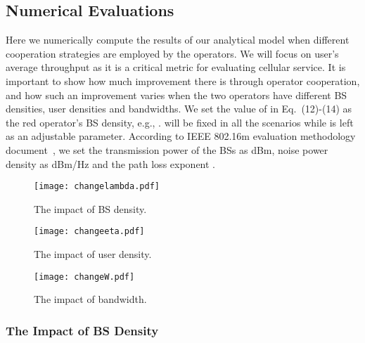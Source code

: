 \documentclass[conference]{IEEEtran}
\begin{document}
\subsection{Numerical Evaluations}

Here we numerically compute the results of our analytical model when different cooperation strategies are employed by the operators. We will focus on user's average throughput as it is a critical metric for evaluating cellular service.  It is important to show how much improvement there is through operator cooperation, and how such an improvement varies when the two operators have different BS densities, user densities and bandwidths. We set the value of  in Eq.~(12)-(14) as the red operator's BS density, e.g., .  will be fixed in all the scenarios while  is left as an adjustable parameter. According to IEEE 802.16m evaluation methodology document~\cite{WiMAXEva}, we set the transmission power of the BSs as  dBm, noise power density as  dBm/Hz and the path loss exponent .
\begin{figure*}[htbp]
\begin{minipage}[b]{0.36\linewidth}
\centering
\texttt{[image: changelambda.pdf]}
\caption{The impact of BS density.}
\label{fig:changelambda}
\end{minipage}
\hspace{-0.37in}
\begin{minipage}[b]{0.36\linewidth}
\centering
\texttt{[image: changeeta.pdf]}
\caption{The impact of user density.}
\label{fig:changeeta}
\end{minipage}
\hspace{-0.37in}
\begin{minipage}[b]{0.36\linewidth}
\centering
\texttt{[image: changeW.pdf]}
\caption{The impact of bandwidth.}
\label{fig:changeW}
\end{minipage}
\end{figure*}

\subsubsection{The Impact of BS Density}
\end{document}

